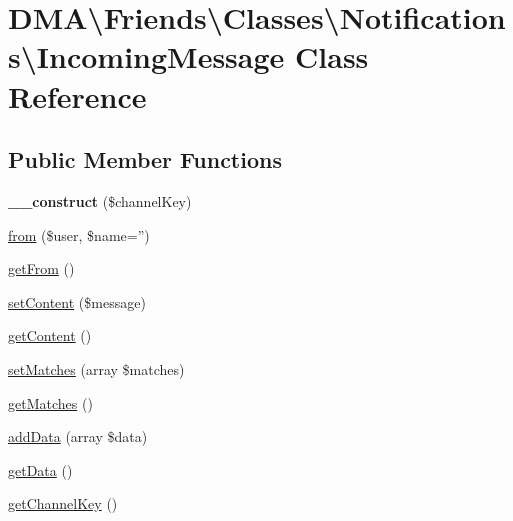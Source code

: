 \hypertarget{classDMA_1_1Friends_1_1Classes_1_1Notifications_1_1IncomingMessage}{\section{D\+M\+A\textbackslash{}Friends\textbackslash{}Classes\textbackslash{}Notifications\textbackslash{}Incoming\+Message Class Reference}
\label{classDMA_1_1Friends_1_1Classes_1_1Notifications_1_1IncomingMessage}
}
\subsection*{Public Member Functions}
\begin{DoxyCompactItemize}
\item 
\hypertarget{classDMA_1_1Friends_1_1Classes_1_1Notifications_1_1IncomingMessage_a859682e7cd422373fd51aeb05e4a8ecd}{{\bfseries \+\_\+\+\_\+construct} (\$channel\+Key)}\label{classDMA_1_1Friends_1_1Classes_1_1Notifications_1_1IncomingMessage_a859682e7cd422373fd51aeb05e4a8ecd}

\item 
\hyperlink{classDMA_1_1Friends_1_1Classes_1_1Notifications_1_1IncomingMessage_a2a37952bdb070d65012f6895d0abd542}{from} (\$user, \$name='')
\item 
\hyperlink{classDMA_1_1Friends_1_1Classes_1_1Notifications_1_1IncomingMessage_a5d7b4a3a75d403ba5e3f250dbe6bb1fc}{get\+From} ()
\item 
\hyperlink{classDMA_1_1Friends_1_1Classes_1_1Notifications_1_1IncomingMessage_a120b5ebba73260b40a0b6a820e26862d}{set\+Content} (\$message)
\item 
\hyperlink{classDMA_1_1Friends_1_1Classes_1_1Notifications_1_1IncomingMessage_a6c870deb4ee36765884d7c7e70d79203}{get\+Content} ()
\item 
\hyperlink{classDMA_1_1Friends_1_1Classes_1_1Notifications_1_1IncomingMessage_a1a9c1b9b62e4601d0f31ee1c2e4c9272}{set\+Matches} (array \$matches)
\item 
\hyperlink{classDMA_1_1Friends_1_1Classes_1_1Notifications_1_1IncomingMessage_a55e79b4061799e19ce96a13b5b59f4a6}{get\+Matches} ()
\item 
\hyperlink{classDMA_1_1Friends_1_1Classes_1_1Notifications_1_1IncomingMessage_a9fd9a20192b9afc5000660391ebf3a01}{add\+Data} (array \$data)
\item 
\hyperlink{classDMA_1_1Friends_1_1Classes_1_1Notifications_1_1IncomingMessage_a13920ffca0f167439137e3766187dc3e}{get\+Data} ()
\item 
\hyperlink{classDMA_1_1Friends_1_1Classes_1_1Notifications_1_1IncomingMessage_a9a6d0d32bb31053a0880db8886001c41}{get\+Channel\+Key} ()
\end{DoxyCompactItemize}
